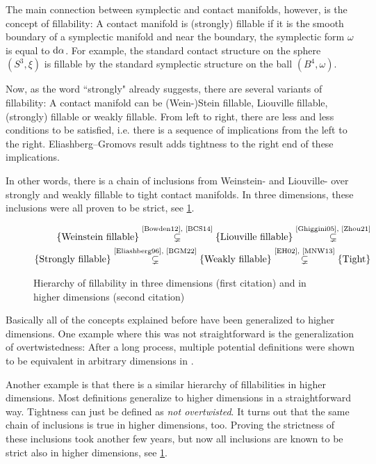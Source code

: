 The main connection between symplectic and contact manifolds, however, is the concept of fillability:
A contact manifold is (strongly) fillable if it is the smooth boundary of a symplectic manifold and
near the boundary, the symplectic form $\omega$ is equal to $\mathrm{d} \alpha$.
For example, the standard contact structure on the sphere $(S^3, \xi)$ is fillable
by the standard symplectic structure on the ball $(B^4, \omega)$.

Now, as the word ``strongly" already suggests, there are several variants of fillability:
A contact manifold can be (Wein-)Stein fillable, Liouville fillable, (strongly) fillable or weakly fillable.
From left to right, there are less and less conditions to be satisfied, i.e. there is a sequence
of implications from the left to the right. 
Eliashberg--Gromovs result adds tightness to the right end of these implications.

In other words, there is a chain of inclusions from 
Weinstein- and Liouville- over strongly and weakly fillable to tight contact manifolds.
In three dimensions, these inclusions were all proven to be strict, see \cref{fig:fillability}.
\begin{figure}
    \begin{align*}
        \{\text{Weinstein fillable}\} \stackrel{\text{\cite{Bowden12}, \cite{BCS14}}}{\subsetneq} 
        \{\text{Liouville fillable}\} \stackrel{\text{\cite{Ghiggini05}, \cite{Zhou21}}}{\subsetneq}\\
        \{\text{Strongly  fillable}\} \stackrel{\text{\cite{Eliashberg96}, \cite{BGM22}}}{\subsetneq}
        \{\text{Weakly    fillable}\} \stackrel{\text{\cite{EH02}, \cite{MNW13}}}{\subsetneq}
        \{\text{Tight}\}
    \end{align*}
    \caption{Hierarchy of fillability in three dimensions (first citation) and in higher dimensions (second citation)}
    \label{fig:fillability}
\end{figure}

Basically all of the concepts explained before have been generalized to higher dimensions.
One example where this was not straightforward is the generalization of overtwistedness: 
After a long process, multiple potential definitions were shown to be equivalent in arbitrary dimensions in \cite{BEM15}.

Another example is that there is a similar hierarchy of fillabilities in higher dimensions. 
Most definitions generalize to higher dimensions in a straightforward way. Tightness can just be defined as \textit{not overtwisted}.
It turns out that the same chain of inclusions is true in higher dimensions, too.
Proving the strictness of these inclusions took another few years, but now all inclusions are known to be strict also in higher dimensions, 
see \cref{fig:fillability}.

